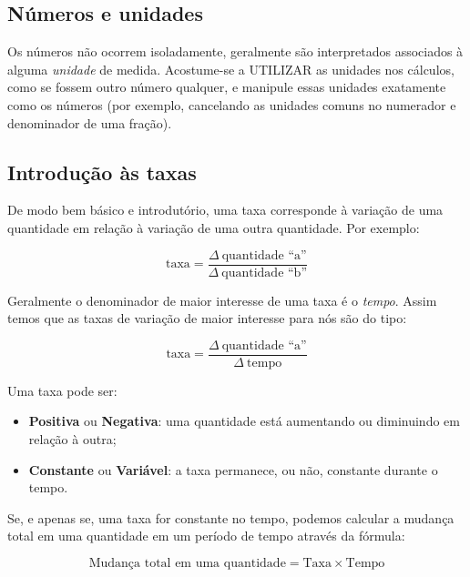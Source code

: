 \documentclass[pdftex, brazil, 12pt, twoside]{article}
\begin{document}
\subsection{Números e unidades}
\label{aquecimento-numeros-unidades}

Os números não ocorrem isoladamente, geralmente são interpretados associados à alguma
\emph{unidade} de medida. Acostume-se a UTILIZAR as unidades nos cálculos, como se
fossem outro número qualquer, e manipule essas unidades exatamente como os números
(por exemplo, cancelando as unidades comuns no numerador e denominador de uma fração).

\subsection{Introdução às taxas}
\label{aquecimento-introducao-taxas}

De modo bem básico e introdutório, uma taxa corresponde à variação de uma quantidade
em relação à variação de uma outra quantidade. Por exemplo:

\begin{equation}
  \text{taxa} = \frac{\Delta\ \text{quantidade ``a''}}{\Delta\ \text{quantidade ``b''}}
\end{equation}

Geralmente o denominador de maior interesse de uma taxa é o \emph{tempo}. Assim temos
que as taxas de variação de maior interesse para nós são do tipo:

\begin{equation}
  \text{taxa} = \frac{\Delta\ \text{quantidade ``a''}}{\Delta\ \text{tempo}}
\end{equation}

Uma taxa pode ser:
\begin{itemize}
\item \textbf{Positiva} ou \textbf{Negativa}: uma quantidade está aumentando ou diminuindo
  em relação à outra;
\item \textbf{Constante} ou \textbf{Variável}: a taxa permanece, ou não, constante durante
  o tempo.
\end{itemize}

Se, e apenas se, uma taxa for constante no tempo, podemos calcular a mudança total em uma quantidade
em um período de tempo através da fórmula:

\begin{equation}
  \text{Mudança total em uma quantidade} = \text{Taxa} \times \text{Tempo}
\end{equation}
\end{document}

